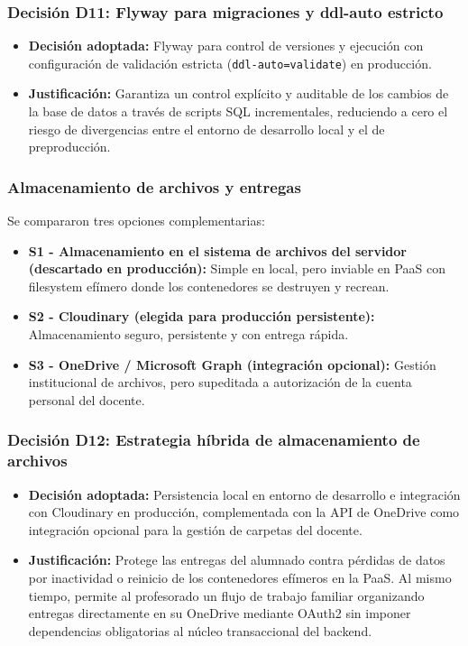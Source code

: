 \subsubsection*{Decisi\'on D11: Flyway para migraciones y ddl-auto estricto}
\begin{itemize}
    \item \textbf{Decisi\'on adoptada:} Flyway \cite{flywaydocs} para control de versiones y ejecuci\'on con configuraci\'on de validaci\'on estricta (\texttt{ddl-auto=validate}) en producci\'on.
    \item \textbf{Justificaci\'on:} Garantiza un control expl\'icito y auditable de los cambios de la base de datos a trav\'es de scripts SQL incrementales, reduciendo a cero el riesgo de divergencias entre el entorno de desarrollo local y el de preproducci\'on.
\end{itemize}

\subsubsection*{Almacenamiento de archivos y entregas}
Se compararon tres opciones complementarias:
\begin{itemize}
    \item \textbf{S1 - Almacenamiento en el sistema de archivos del servidor (descartado en producci\'on):} Simple en local, pero inviable en PaaS con filesystem ef\'imero donde los contenedores se destruyen y recrean.
    \item \textbf{S2 - Cloudinary (elegida para producci\'on persistente):} Almacenamiento seguro, persistente y con entrega r\'apida.
    \item \textbf{S3 - OneDrive / Microsoft Graph (integraci\'on opcional):} Gesti\'on institucional de archivos, pero supeditada a autorizaci\'on de la cuenta personal del docente.
\end{itemize}

\subsubsection*{Decisi\'on D12: Estrategia h\'ibrida de almacenamiento de archivos}
\begin{itemize}
    \item \textbf{Decisi\'on adoptada:} Persistencia local en entorno de desarrollo e integraci\'on con Cloudinary en producci\'on, complementada con la API de OneDrive como integraci\'on opcional para la gesti\'on de carpetas del docente.
    \item \textbf{Justificaci\'on:} Protege las entregas del alumnado contra p\'erdidas de datos por inactividad o reinicio de los contenedores ef\'imeros en la PaaS. Al mismo tiempo, permite al profesorado un flujo de trabajo familiar organizando entregas directamente en su OneDrive mediante OAuth2 sin imponer dependencias obligatorias al n\'ucleo transaccional del backend.
\end{itemize}

